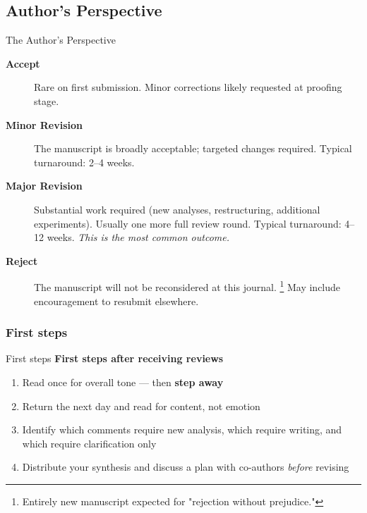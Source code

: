 \documentclass{beamer}
\begin{document}
\subsection{Author's Perspective}
\begin{frame}{The Author's Perspective}

  \footnotesize
  \begin{description}
    \item[\textbf{Accept}]
      Rare on first submission. Minor corrections likely requested at proofing stage.
    \item[\textbf{Minor Revision}]
      The manuscript is broadly acceptable; targeted changes
      required. Typical turnaround: 2--4 weeks.
    \item[\textbf{Major Revision}]
      Substantial work required (new analyses, restructuring,
      additional experiments). Usually one more full review round.
      Typical turnaround: 4--12 weeks.
      \emph{This is the most common outcome.}
    \item[\textbf{Reject}]
      The manuscript will not be reconsidered at this journal.%
      \footnote{\scriptsize Entirely new manuscript expected for "rejection without prejudice." }
      May include encouragement to resubmit elsewhere.
  \end{description}
\end{frame}


\subsubsection{First steps}
\begin{frame}{First steps}
  \textbf{First steps after receiving reviews}
  \begin{enumerate}
    \item Read once for overall tone --- then \textbf{step away}
    \item Return the next day and read for content, not emotion
    \item Identify which comments require new analysis, which
      require writing, and which require clarification only
    \item Distribute your synthesis and discuss a plan with co-authors \emph{before} revising
  \end{enumerate}
\end{frame}

\end{document}
